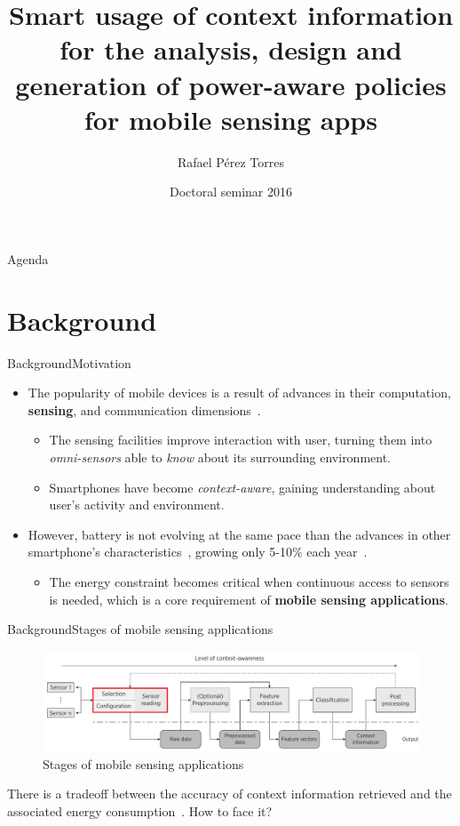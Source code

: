 \documentclass[10pt,xcolor={dvipsnames},handout]{beamer}
\title[Smart usage of context information for the analysis, design and generation of power-aware policies for MSA's]{Smart usage of context information for the analysis, design and generation of power-aware policies for mobile sensing apps}
\date{Doctoral seminar 2016}
\author{
  Rafael Pérez Torres
}
\institute[
  ITL Information Technology Laboratory\\
  Cinvestav\\
  Tamaulipas
] %
{%
  Dr. César Torres Huitzil\\
  Dr. Hiram Galeana Zapién\\

  LTI Cinvestav
  
}
\begin{document}
{\aauwavesbg%
\begin{frame} %
  \titlepage
\end{frame}}

\begin{frame}{Agenda}{}
\tableofcontents
\end{frame}

\section{Background}
\begin{frame}{Background}{Motivation}
\begin{itemize}
  \item<1-> The popularity of mobile devices is a result of advances in their computation, \textbf{sensing}, and communication dimensions~\cite{Islam2014}.
  \begin{itemize}
    \item<1-> The sensing facilities improve interaction with user, turning them into \emph{omni-sensors} able to \emph{know} about its surrounding environment.
    \item<2-> Smartphones have become \emph{context-aware}, gaining understanding about user's activity and environment.
  \end{itemize}
  \item<3-> However, battery is not evolving at the same pace than the advances in other smartphone's characteristics~\cite{Kjaergaard2012}, growing only 5-10\% each year~\cite{Ma2012,Evarts2015}.
  \begin{itemize}
    \item The energy constraint becomes critical when continuous access to sensors is needed, which is a core requirement of \textbf{mobile sensing applications}. 
  \end{itemize}
\end{itemize}
\end{frame}

\begin{frame}{Background}{Stages of mobile sensing applications}
\begin{figure}%
  \centering
  \includegraphics[width=\textwidth]{vectors/msa-stages}
  \caption{Stages of mobile sensing applications}
  \label{fig:msa-stages}
\end{figure}
There is a tradeoff between the accuracy of context information retrieved and the associated energy consumption~\cite{Sim2014,Rachuri2012}.
How to face it?
\end{frame}
\end{document}
